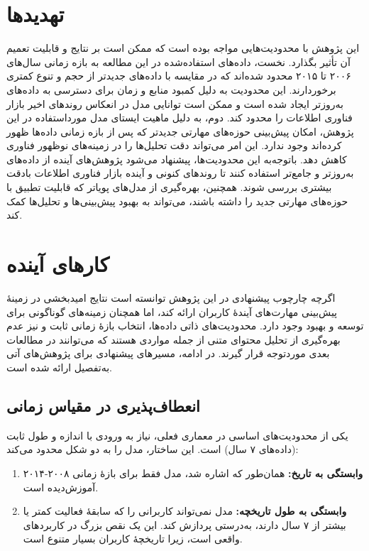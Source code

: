 \section{تهدید‌ها}
این پژوهش با محدودیت‌هایی مواجه بوده است که ممکن است بر نتایج و قابلیت تعمیم آن تأثیر بگذارد. نخست، داده‌های استفاده‌شده در این مطالعه به بازه زمانی سال‌های ۲۰۰۶ تا ۲۰۱۵ محدود شده‌اند که در مقایسه با داده‌های جدیدتر از حجم و تنوع کمتری برخوردارند. این محدودیت به دلیل کمبود منابع و زمان برای دسترسی به داده‌های به‌روزتر ایجاد شده است و ممکن است توانایی مدل در انعکاس روندهای اخیر بازار فناوری اطلاعات را محدود کند. دوم، به دلیل ماهیت ایستای مدل مورداستفاده در این پژوهش، امکان پیش‌بینی حوزه‌های مهارتی جدیدتر که پس از بازه زمانی داده‌ها ظهور کرده‌اند وجود ندارد. این امر می‌تواند دقت تحلیل‌ها را در زمینه‌های نوظهور فناوری کاهش دهد.
باتوجه‌به این محدودیت‌ها، پیشنهاد می‌شود پژوهش‌های آینده از داده‌های به‌روزتر و جامع‌تر استفاده کنند تا روندهای کنونی و آینده بازار فناوری اطلاعات بادقت بیشتری بررسی شوند. همچنین، بهره‌گیری از مدل‌های پویاتر که قابلیت تطبیق با حوزه‌های مهارتی جدید را داشته باشند، می‌تواند به بهبود پیش‌بینی‌ها و تحلیل‌ها کمک کند.

\section{کارهای آینده}

اگرچه چارچوب پیشنهادی در این پژوهش توانسته است نتایج امیدبخشی در زمینهٔ پیش‌بینی مهارت‌های آیندهٔ کاربران ارائه کند، اما همچنان زمینه‌های گوناگونی برای توسعه و بهبود وجود دارد. محدودیت‌های ذاتی داده‌ها، انتخاب بازهٔ زمانی ثابت و نیز عدم بهره‌گیری از تحلیل محتوای متنی از جمله مواردی هستند که می‌توانند در مطالعات بعدی موردتوجه قرار گیرند. در ادامه، مسیرهای پیشنهادی برای پژوهش‌های آتی به‌تفصیل ارائه شده است.

\subsection{انعطاف‌پذیری در مقیاس زمانی}
یکی از محدودیت‌های اساسی در معماری فعلی، نیاز به ورودی با اندازه و طول ثابت (داده‌های ۷ سال) است. این ساختار، مدل را به دو شکل محدود می‌کند:

\begin{enumerate}
   \item \textbf{وابستگی به تاریخ: } همان‌طور که اشاره شد، مدل فقط برای بازهٔ زمانی ۲۰۰۸-۲۰۱۴ آموزش‌دیده است.
   \item \textbf{وابستگی به طول تاریخچه: } مدل نمی‌تواند کاربرانی را که سابقهٔ فعالیت کمتر یا بیشتر از ۷ سال دارند، به‌درستی پردازش کند. این یک نقص بزرگ در کاربردهای واقعی است، زیرا تاریخچهٔ کاربران بسیار متنوع است.
\end{enumerate}

